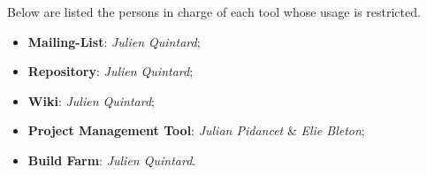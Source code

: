 Below are listed the persons in charge of each tool whose usage is restricted.

\begin{itemize}
  \item
    \textbf{Mailing-List}: \textit{Julien Quintard};
  \item
    \textbf{Repository}: \textit{Julien Quintard};
  \item
    \textbf{Wiki}: \textit{Julien Quintard};
  \item
    \textbf{Project Management Tool}: \textit{Julian Pidancet} \&
    \textit{Elie Bleton};
  \item
    \textbf{Build Farm}: \textit{Julien Quintard}.
\end{itemize}
